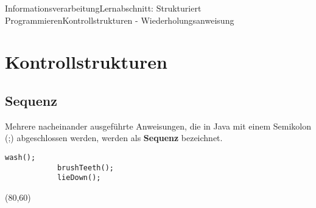 \documentclass[11pt,oneside,openany,headings=optiontotoc,11pt,numbers=noenddot]{article}
\begin{document}
	\begin{worksheet}{Informationsverarbeitung}{Lernabschnitt: Strukturiert Programmieren}{Kontrollstrukturen - Wiederholungsanweisung}
		\setlength{\columnseprule}{0pt}
		\noindent
		\setcounter{section}{5}
		\setcounter{page}{16}
		\section{Kontrollstrukturen}
		\subsection{Sequenz}
		Mehrere nacheinander ausgeführte Anweisungen, die in Java mit einem Semikolon (;) abgeschlossen werden, werden als \textbf{Sequenz} bezeichnet.\\
		\par\noindent
		\begin{minipage}[t]{0.48\textwidth}
			\vspace*{0pt}
			\begin{lstlisting}[style=JavaInputStyle,frame=single]
			wash();
			brushTeeth();
			lieDown();
			\end{lstlisting}
		\end{minipage}
		\hfill
		\begin{minipage}[t]{0.48\textwidth}
			\vspace*{0pt}
			\begin{struktogramm}(80,60)
			\end{struktogramm}
		\end{minipage}

\end{worksheet}
\end{document}
